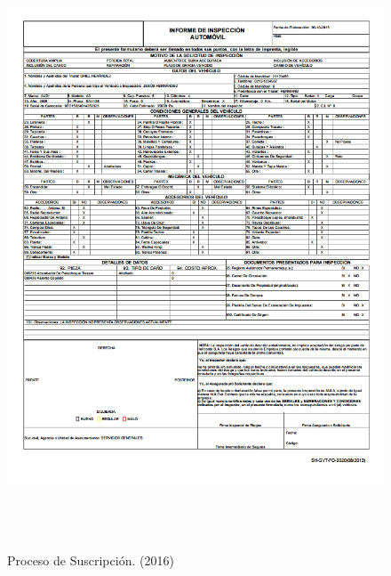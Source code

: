 \begin{figure}[H]
\begin{center}
	\includegraphics[width=\textwidth,height=18cm]{img/planilla_suscripcion.png}
\end{center}
\caption{Proceso de Suscripción. (2016)}
\label{fig:planilla_suscripcion}
\end{figure}
\setlength{\parskip}{0mm}